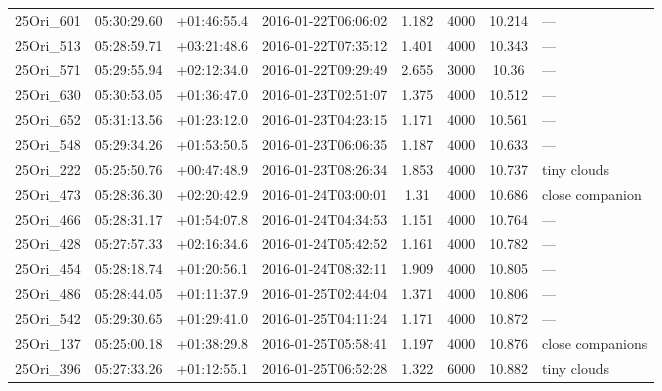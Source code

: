 \documentclass[12pt]{article}
\begin{document}
\begin{table}[ht!]
\begin{center}
\begin{threeparttable}
\begin{tabular}{lccccccl}
	25Ori\_601    & 05:30:29.60 & +01:46:55.4 & 2016-01-22T06:06:02  & 1.182         & 4000             & 10.214 & ---                      \\
	25Ori\_513    & 05:28:59.71 & +03:21:48.6 & 2016-01-22T07:35:12  & 1.401         & 4000             & 10.343 & ---                      \\
	25Ori\_571    & 05:29:55.94 & +02:12:34.0 & 2016-01-22T09:29:49  & 2.655         & 3000             & 10.36  & ---                      \\
	25Ori\_630    & 05:30:53.05 & +01:36:47.0 & 2016-01-23T02:51:07  & 1.375         & 4000             & 10.512 & ---                      \\
	25Ori\_652    & 05:31:13.56 & +01:23:12.0 & 2016-01-23T04:23:15  & 1.171         & 4000             & 10.561 & ---                      \\
	25Ori\_548    & 05:29:34.26 & +01:53:50.5 & 2016-01-23T06:06:35  & 1.187         & 4000             & 10.633 & ---                      \\
	25Ori\_222    & 05:25:50.76 & +00:47:48.9 & 2016-01-23T08:26:34  & 1.853         & 4000             & 10.737 & tiny clouds              \\
	25Ori\_473    & 05:28:36.30 & +02:20:42.9 & 2016-01-24T03:00:01  & 1.31          & 4000             & 10.686 & close companion         \\
	25Ori\_466    & 05:28:31.17 & +01:54:07.8 & 2016-01-24T04:34:53  & 1.151         & 4000             & 10.764 & ---                      \\
	25Ori\_428    & 05:27:57.33 & +02:16:34.6 & 2016-01-24T05:42:52  & 1.161         & 4000             & 10.782 & ---                      \\
	25Ori\_454    & 05:28:18.74 & +01:20:56.1 & 2016-01-24T08:32:11  & 1.909         & 4000             & 10.805 & ---                      \\
	25Ori\_486    & 05:28:44.05 & +01:11:37.9 & 2016-01-25T02:44:04  & 1.371         & 4000             & 10.806 & ---                      \\
	25Ori\_542    & 05:29:30.65 & +01:29:41.0 & 2016-01-25T04:11:24  & 1.171         & 4000             & 10.872 & ---                      \\
	25Ori\_137    & 05:25:00.18 & +01:38:29.8 & 2016-01-25T05:58:41  & 1.197         & 4000             & 10.876 & close companions         \\
	25Ori\_396    & 05:27:33.26 & +01:12:55.1 & 2016-01-25T06:52:28  & 1.322         & 6000             & 10.882 & tiny clouds              \\

\end{tabular}
\end{threeparttable}
\end{center}
\end{table}
\end{document}
